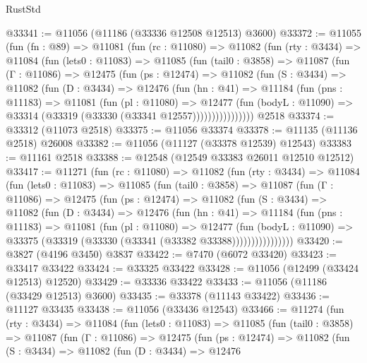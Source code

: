 \begin{lexlean}{RustStd}
\begin{coremodule}
@33341 := @11056 (@11186 (@33336 @12508 @12513) @3600)
@33372 := @11055
    (fun (fn : @89) =>
    @11081
      (fun (rc : @11080) =>
      @11082
        (fun (rty : @3434) =>
        @11084
          (fun (lets0 : @11083) =>
          @11085
            (fun (tail0 : @3858) =>
            @11087
              (fun (Γ : @11086) =>
              @12475
                (fun (ps : @12474) =>
                @11082
                  (fun (S : @3434) =>
                  @11082
                    (fun (D : @3434) =>
                    @12476
                      (fun (hn : @41) =>
                      @11184
                        (fun (pns : @11183) =>
                        @11081
                          (fun (pl : @11080) =>
                          @12477
                            (fun (bodyL : @11090) =>
                            @33314 (@33319 (@33330 (@33341 @12557))))))))))))))))
    @2518
@33374 := @33312 (@11073 @2518)
@33375 := @11056 @33374
@33378 := @11135 (@11136 @2518) @26008
@33382 := @11056 (@11127 (@33378 @12539) @12543)
@33383 := @11161 @2518
@33388 := @12548 (@12549 @33383 @26011 @12510 @12512)
@33417 := @11271
    (fun (rc : @11080) =>
    @11082
      (fun (rty : @3434) =>
      @11084
        (fun (lets0 : @11083) =>
        @11085
          (fun (tail0 : @3858) =>
          @11087
            (fun (Γ : @11086) =>
            @12475
              (fun (ps : @12474) =>
              @11082
                (fun (S : @3434) =>
                @11082
                  (fun (D : @3434) =>
                  @12476
                    (fun (hn : @41) =>
                    @11184
                      (fun (pns : @11183) =>
                      @11081
                        (fun (pl : @11080) =>
                        @12477
                          (fun (bodyL : @11090) =>
                          @33375 (@33319 (@33330 (@33341 (@33382 @33388))))))))))))))))
@33420 := @3827 (@4196 @3450) @3837
@33422 := @7470 (@6072 @33420)
@33423 := @33417 @33422
@33424 := @33325 @33422
@33428 := @11056 (@12499 (@33424 @12513) @12520)
@33429 := @33336 @33422
@33433 := @11056 (@11186 (@33429 @12513) @3600)
@33435 := @33378 (@11143 @33422)
@33436 := @11127 @33435
@33438 := @11056 (@33436 @12543)
@33466 := @11274
    (fun (rty : @3434) =>
    @11084
      (fun (lets0 : @11083) =>
      @11085
        (fun (tail0 : @3858) =>
        @11087
          (fun (Γ : @11086) =>
          @12475
            (fun (ps : @12474) =>
            @11082
              (fun (S : @3434) =>
              @11082
                (fun (D : @3434) =>
                @12476

\end{coremodule}
\end{lexlean}
